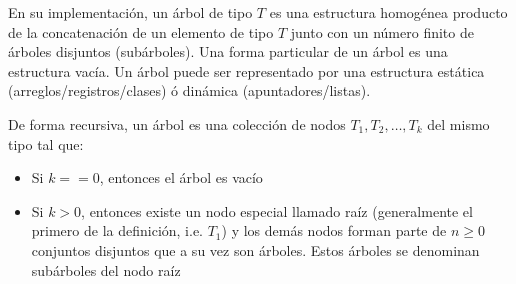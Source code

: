 En su implementación, un árbol de tipo $T$ es una estructura homogénea producto de la concatenación de un elemento de tipo $T$ junto con un número finito de árboles disjuntos (subárboles). Una forma particular de un árbol es una estructura vacía. Un árbol puede ser representado por una estructura estática (arreglos/registros/clases) ó dinámica (apuntadores/listas).

De forma recursiva, un árbol es una colección de nodos ${T_1, T_2,\dots, T_k}$ del mismo tipo tal que:
\begin{itemize}
\item Si $k == 0$, entonces el árbol es vacío
\item Si $k > 0$, entonces existe un nodo especial llamado raíz (generalmente el primero de la definición, i.e. $T_1$) y los demás nodos forman parte de $n \ge 0$ conjuntos disjuntos que a su vez son árboles. Estos árboles se denominan subárboles del nodo raíz
\end{itemize}

